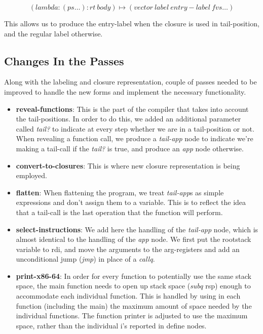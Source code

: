 \documentclass[12pt]{article}
\begin{document}
\begin{equation*}
(lambda: (ps \ldots) : rt\ body) \mapsto (vector\ label\ entry-label\ fvs \ldots)
\end{equation*}

This allows us to produce the entry-label when the closure is used in
tail-position, and the regular label otherwise.

\subsection{Changes In the Passes}

Along with the labeling and closure representation, couple of passes
needed to be improved to handle the new forms and implement the
necessary functionality.

\begin{itemize}
\item \textbf{reveal-functions}: This is the part of the compiler that
  takes into account the tail-positions. In order to do this, we added
  an additional parameter called \emph{tail?} to indicate at every
  step whether we are in a tail-position or not. When revealing a
  function call, we produce a \emph{tail-app} node to indicate we're
  making a tail-call if the \emph{tail?} is true, and produce an
  \emph{app} node otherwise.
\item \textbf{convert-to-closures}: This is where new closure
  representation is being employed.
\item \textbf{flatten}: When flattening the program, we treat
  \emph{tail-app}s as simple expressions and don't assign them to a
  variable. This is to reflect the idea that a tail-call is the last
  operation that the function will perform.
\item \textbf{select-instructions}: We add here the handling of the
  \emph{tail-app} node, which is almost identical to the handling of
  the \emph{app} node. We first put the rootstack variable to rdi, and
  move the arguments to the arg-registers and add an unconditional
  jump (\emph{jmp}) in place of a \emph{callq}.
\item \textbf{print-x86-64}: In order for every function to
  potentially use the same stack space, the main function needs to
  open up stack space (\emph{subq} rsp) enough to accommodate each
  individual function. This is handled by using in each function
  (including the main) the maximum amount of space needed by the
  individual functions. The function printer is adjusted to use the
  maximum space, rather than the individual i's reported in define
  nodes.
\end{itemize}
\end{document}
